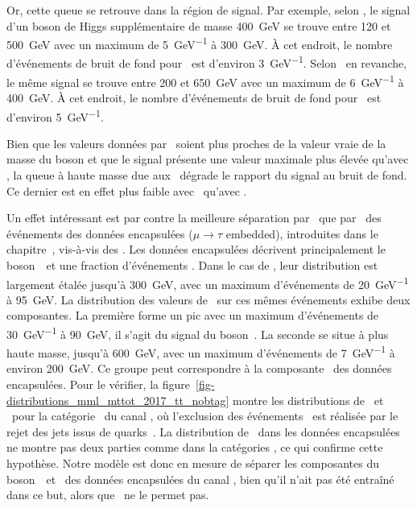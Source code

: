 Or, cette queue se retrouve dans la région de signal.
Par exemple,
selon \mTtot,
le signal d'un boson de Higgs supplémentaire de masse \SI{400}{\GeV} se trouve
entre \num{120} et \SI{500}{\GeV}
avec un maximum de \SI{5}{\GeV^{-1}} à \SI{300}{\GeV}.
À cet endroit, le nombre d'événements de bruit de fond pour \mTtot\ est d'environ \SI{3}{\GeV^{-1}}.
Selon \mml\ en revanche,
le même signal se trouve
entre \num{200} et \SI{650}{\GeV}
avec un maximum de \SI{6}{\GeV^{-1}} à \SI{400}{\GeV}.
À cet endroit, le nombre d'événements de bruit de fond pour \mml\ est d'environ \SI{5}{\GeV^{-1}}.
\par
Bien que les valeurs données par \mml\ soient plus proches de la valeur vraie de la masse du boson
et que le signal présente une valeur maximale plus élevée qu'avec \mTtot,
la queue à haute masse due aux \ftauhs\ dégrade le rapport du signal au bruit de fond.
Ce dernier est en effet plus faible avec \mml\ qu'avec \mTtot.
\par
Un effet intéressant est par contre la meilleure séparation par \mml\ que par \mTtot\ des événements
des données encapsulées ($\mu\to\tau$ embedded), introduites dans le chapitre~,
vis-à-vis des \ftauhs.
Les données encapsulées décrivent principalement le boson~\Zboson\ et une fraction d'événements \ttbar.
Dans le cas de \mTtot,
leur distribution est 
largement étalée
jusqu'à \SI{300}{\GeV},
avec un maximum d'événements de \SI{20}{\GeV^{-1}} à \SI{95}{\GeV}.
La distribution des valeurs de \mml\ sur ces mêmes événements
exhibe deux composantes.
La première forme un pic
avec un maximum d'événements de \SI{30}{\GeV^{-1}} à \SI{90}{\GeV},
il s'agit du signal du boson~\Zboson.
La seconde se situe à plus haute masse,
jusqu'à \SI{600}{\GeV},
avec un maximum d'événements de \SI{7}{\GeV^{-1}} à environ \SI{200}{\GeV}.
Ce groupe peut correspondre à la composante \ttbar\ des données encapsulées.
Pour le vérifier, la figure~\ref{fig-distributions_mml_mttot_2017_tt_nobtag}
montre les distributions de \mTtot\ et \mml\ pour la catégorie \CATnobtag\ du canal \tauh\tauh,
où l'exclusion des événements \ttbar\ est réalisée par le rejet des jets issus de quarks~\quarkb.
La distribution de \mml\ dans les données encapsulées ne montre pas deux parties comme dans la catégories \CATbtag,
ce qui confirme cette hypothèse.
Notre modèle est donc en mesure de séparer les composantes du boson~\Zboson\ et \ttbar\ des données encapsulées du canal \tauh\tauh,
bien qu'il n'ait pas été entraîné dans ce but,
alors que \mTtot\ ne le permet pas.
